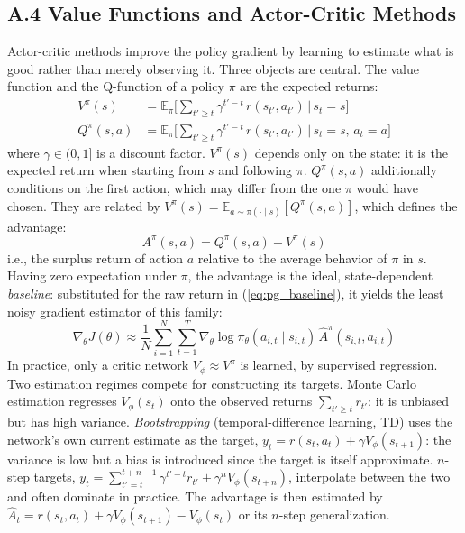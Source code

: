 \documentclass[11pt,a4paper]{article}
\begin{document}
\subsection*{A.4 Value Functions and Actor-Critic Methods}
Actor-critic methods improve the policy gradient by learning to estimate what is good rather than merely observing it. Three objects are central. The value function and the Q-function of a policy $\pi$ are the expected returns:
\begin{align}
V^\pi(s) &= \mathbb{E}_\pi \Big[ \textstyle\sum_{t' \geq t} \gamma^{t'-t}\, r(s_{t'}, a_{t'}) \,\Big|\, s_t = s \Big] \\
Q^\pi(s, a) &= \mathbb{E}_\pi \Big[ \textstyle\sum_{t' \geq t} \gamma^{t'-t}\, r(s_{t'}, a_{t'}) \,\Big|\, s_t = s, \, a_t = a \Big]
\end{align}
where $\gamma \in (0, 1]$ is a discount factor. $V^\pi(s)$ depends only on the state: it is the expected return when starting from $s$ and following $\pi$. $Q^\pi(s,a)$ additionally conditions on the first action, which may differ from the one $\pi$ would have chosen. They are related by $V^\pi(s) = \mathbb{E}_{a \sim \pi(\cdot \mid s)}[Q^\pi(s,a)]$, which defines the advantage:
\begin{equation}
A^\pi(s, a) = Q^\pi(s, a) - V^\pi(s)
\end{equation}
i.e., the surplus return of action $a$ relative to the average behavior of $\pi$ in $s$. Having zero expectation under $\pi$, the advantage is the ideal, state-dependent \emph{baseline}: substituted for the raw return in (\ref{eq:pg_baseline}), it yields the least noisy gradient estimator of this family:
\begin{equation}
\nabla_\theta J(\theta) \approx \frac{1}{N} \sum_{i=1}^{N} \sum_{t=1}^{T} \nabla_\theta \log \pi_\theta(a_{i,t} \mid s_{i,t}) \, \hat{A}^\pi(s_{i,t}, a_{i,t})
\label{eq:actor_critic_grad}
\end{equation}
In practice, only a critic network $V_\phi \approx V^\pi$ is learned, by supervised regression. Two estimation regimes compete for constructing its targets. Monte Carlo estimation regresses $V_\phi(s_t)$ onto the observed returns $\sum_{t' \geq t} r_{t'}$: it is unbiased but has high variance. \emph{Bootstrapping} (temporal-difference learning, TD) uses the network's own current estimate as the target, $y_t = r(s_t, a_t) + \gamma V_\phi(s_{t+1})$: the variance is low but a bias is introduced since the target is itself approximate. $n$-step targets, $y_t = \sum_{t'=t}^{t+n-1} \gamma^{t'-t} r_{t'} + \gamma^n V_\phi(s_{t+n})$, interpolate between the two and often dominate in practice. The advantage is then estimated by $\hat{A}_t = r(s_t, a_t) + \gamma V_\phi(s_{t+1}) - V_\phi(s_t)$ or its $n$-step generalization.
\end{document}

